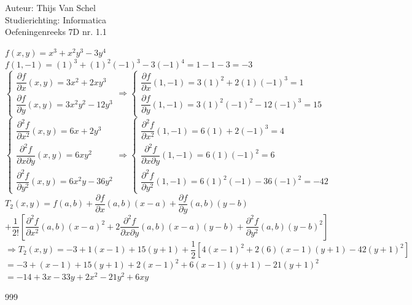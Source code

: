\documentclass[a4paper]{article}
\begin{document}
  
\noindent \large Auteur: Thijs Van Schel \\
\noindent \large Studierichting: Informatica\\
\noindent \large Oefeningenreeks 7D nr. 1.1\\

\medskip

\normalsize

$f(x,y) = x^3 + x^2y^3 - 3y^4$\\

$f(1,-1) = (1)^3 + (1)^2(-1)^3 - 3(-1)^4 = 1 - 1 - 3 = -3$\\

$
\left\{ 
\begin{array}{l} 
\dfrac{\partial f}{\partial x}(x,y) = 3x^2 + 2xy^3 \\[3ex] 
\dfrac{\partial f}{\partial y}(x,y) = 3x^2y^2 - 12y^3 
\end{array} 
\right.
\Rightarrow
\left\{ 
\begin{array}{l} 
\dfrac{\partial f}{\partial x}(1,-1) = 3(1)^2 + 2(1)(-1)^3 = 1 \\[3ex] 
\dfrac{\partial f}{\partial y}(1,-1) = 3(1)^2(-1)^2 - 12(-1)^3 = 15 
\end{array} 
\right.
$ \\

$
\left\{ 
\begin{array}{l} 
\dfrac{\partial^2 f}{\partial x^2}(x,y) = 6x + 2y^3 \\[3ex] 
\dfrac{\partial^2 f}{\partial x \partial y}(x,y) = 6xy^2 \\[3ex]
\dfrac{\partial^2 f}{\partial y^2}(x,y) = 6x^2y - 36y^2
\end{array} 
\right.
\Rightarrow
\left\{ 
\begin{array}{l} 
\dfrac{\partial^2 f}{\partial x^2}(1,-1) = 6(1) + 2(-1)^3 = 4 \\[3ex] 
\dfrac{\partial^2 f}{\partial x \partial y}(1,-1) = 6(1)(-1)^2 = 6 \\[3ex]
\dfrac{\partial^2 f}{\partial y^2}(1,-1) = 6(1)^2(-1) - 36(-1)^2 = -42
\end{array} 
\right.
$ \\

$T_2(x,y) = f(a,b) + \dfrac{\partial f}{\partial x}(a,b)(x-a) + \dfrac{\partial f}{\partial y}(a,b)(y-b)$\\

$+ \dfrac{1}{2!} \left[ \dfrac{\partial^2 f}{\partial x^2}(a,b)(x-a)^2 + 2\dfrac{\partial^2 f}{\partial x \partial y}(a,b)(x-a)(y-b) + \dfrac{\partial^2 f}{\partial y^2}(a,b)(y-b)^2 \right]$\\

$\Rightarrow T_2(x,y) = -3 + 1(x-1) + 15(y+1) + \dfrac{1}{2} \left[ 4(x-1)^2 + 2(6)(x-1)(y+1) - 42(y+1)^2 \right]$\\

$= -3 + (x-1) + 15(y+1) + 2(x-1)^2 + 6(x-1)(y+1) - 21(y+1)^2$\\

$= -14 + 3x - 33y + 2x^2 - 21y^2 + 6xy$\\

\begin{thebibliography}{999}
\end{thebibliography}
\end{document}
